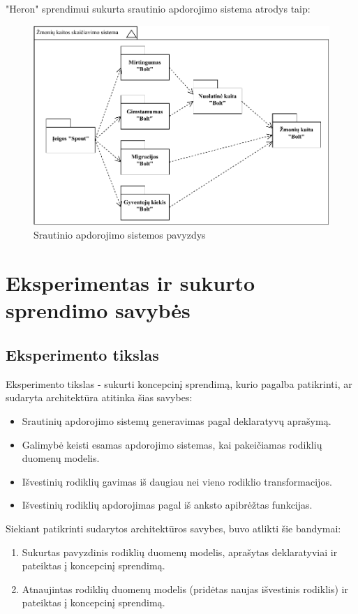\documentclass{VUMIFPSbakalaurinis}
\begin{document}
"Heron" sprendimui sukurta srautinio apdorojimo sistema atrodys taip:
\begin{figure}[H]
    \centering
    \includegraphics[width=1\textwidth]{img/generuota_sistema.pdf}
    \caption{Srautinio apdorojimo sistemos pavyzdys}
    \label{img:example}
\end{figure}

\section{Eksperimentas ir sukurto sprendimo savybės}

\subsection{Eksperimento tikslas}

Eksperimento tikslas - sukurti koncepcinį sprendimą, kurio pagalba patikrinti, ar sudaryta architektūra atitinka šias savybes:
\begin{itemize}
    \item Srautinių apdorojimo sistemų generavimas pagal deklaratyvų aprašymą.
    \item Galimybė keisti esamas apdorojimo sistemas, kai pakeičiamas rodiklių duomenų modelis.
    \item Išvestinių rodiklių gavimas iš daugiau nei vieno rodiklio transformacijos.
    \item Išvestinių rodiklių apdorojimas pagal iš anksto apibrėžtas funkcijas.
\end{itemize}  

\noindent Siekiant patikrinti sudarytos architektūros savybes, buvo atlikti šie bandymai:
\begin{enumerate}
    \item Sukurtas pavyzdinis rodiklių duomenų modelis, aprašytas deklaratyviai ir pateiktas į koncepcinį sprendimą.
    \item Atnaujintas rodiklių duomenų modelis (pridėtas naujas išvestinis rodiklis) ir pateiktas į koncepcinį sprendimą.
\end{enumerate}
\end{document}

